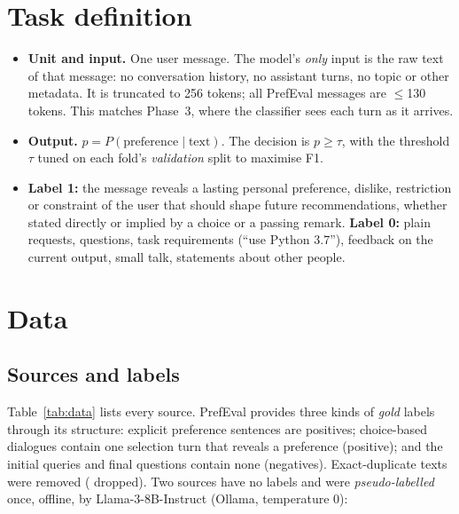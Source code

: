 \documentclass[11pt,a4paper]{article}
\begin{document}
\section{Task definition}
\begin{itemize}
  \item \textbf{Unit and input.} One user message. The model's \emph{only} input is the raw text of that message: no conversation
        history, no assistant turns, no topic or other metadata. It is truncated to 256 tokens; all PrefEval messages are $\le$130 tokens.
        This matches Phase~3, where the classifier sees each turn as it arrives.
  \item \textbf{Output.} $p = P(\text{preference} \mid \text{text})$. The decision is $p \ge \tau$, with the threshold $\tau$ tuned on each fold's
        \emph{validation} split to maximise F1.
  \item \textbf{Label 1:} the message reveals a lasting personal preference, dislike, restriction or constraint of the user that should
        shape future recommendations, whether stated directly or implied by a choice or a passing remark. \textbf{Label 0:} plain
        requests, questions, task requirements (``use Python 3.7''), feedback on the current output, small talk, statements about other people.
\end{itemize}

\section{Data}

\subsection{Sources and labels}
Table~\ref{tab:data} lists every source. PrefEval provides three kinds of \emph{gold} labels through its structure:
explicit preference sentences are positives; choice-based dialogues contain one selection turn that reveals a preference (positive);
and the initial queries and final questions contain none (negatives). Exact-duplicate texts were removed (\pDupDropped{} dropped).
Two sources have no labels and were \emph{pseudo-labelled} once, offline, by Llama-3-8B-Instruct (Ollama, temperature 0):
\end{document}
